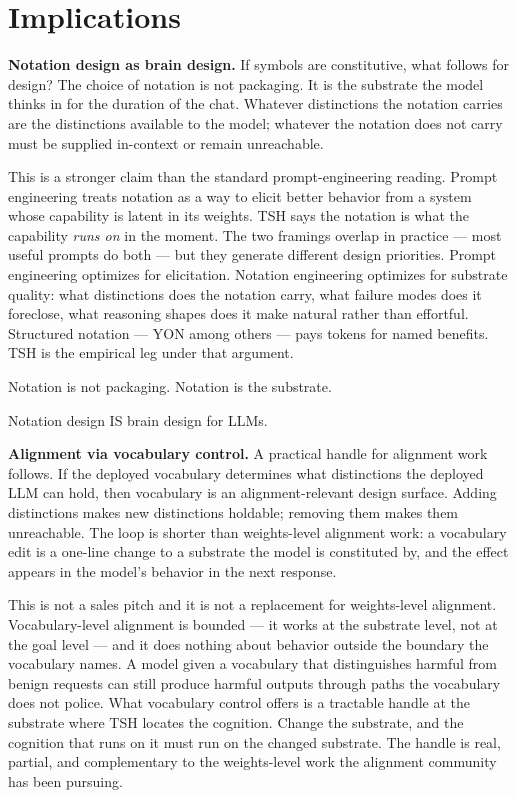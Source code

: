 \documentclass[11pt,a4paper]{article}
\begin{document}
\section{Implications}

\textbf{Notation design as brain design.} If symbols are constitutive, what follows for design? The choice of notation is not packaging. It is the substrate the model thinks in for the duration of the chat. Whatever distinctions the notation carries are the distinctions available to the model; whatever the notation does not carry must be supplied in-context or remain unreachable.

This is a stronger claim than the standard prompt-engineering reading. Prompt engineering treats notation as a way to elicit better behavior from a system whose capability is latent in its weights. TSH says the notation is what the capability \textit{runs on} in the moment. The two framings overlap in practice --- most useful prompts do both --- but they generate different design priorities. Prompt engineering optimizes for elicitation. Notation engineering optimizes for substrate quality: what distinctions does the notation carry, what failure modes does it foreclose, what reasoning shapes does it make natural rather than effortful. Structured notation --- YON among others --- pays tokens for named benefits. TSH is the empirical leg under that argument.

Notation is not packaging. Notation is the substrate.

Notation design IS brain design for LLMs.

\textbf{Alignment via vocabulary control.} A practical handle for alignment work follows. If the deployed vocabulary determines what distinctions the deployed LLM can hold, then vocabulary is an alignment-relevant design surface. Adding distinctions makes new distinctions holdable; removing them makes them unreachable. The loop is shorter than weights-level alignment work: a vocabulary edit is a one-line change to a substrate the model is constituted by, and the effect appears in the model's behavior in the next response.

This is not a sales pitch and it is not a replacement for weights-level alignment. Vocabulary-level alignment is bounded --- it works at the substrate level, not at the goal level --- and it does nothing about behavior outside the boundary the vocabulary names. A model given a vocabulary that distinguishes harmful from benign requests can still produce harmful outputs through paths the vocabulary does not police. What vocabulary control offers is a tractable handle at the substrate where TSH locates the cognition. Change the substrate, and the cognition that runs on it must run on the changed substrate. The handle is real, partial, and complementary to the weights-level work the alignment community has been pursuing.
\end{document}
